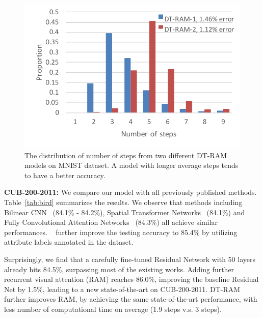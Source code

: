 \documentclass[10pt,twocolumn,letterpaper]{article}
\begin{document}
\setlength{\tabcolsep}{1pt}
\begin{figure}
\begin{center}
    \includegraphics[width=0.95\linewidth]{figs/exp/mnist_distribution.pdf}
\end{center}
\vspace{-10pt}
\caption{The distribution of number of steps from two different DT-RAM models on MNIST dataset. A model with longer average steps tends to have a better accuracy.}
\label{fig:MNIST}
\end{figure}

{\bf CUB-200-2011:} We compare our model with all previously published methods.
Table~\ref{tab:bird} summarizes the results.
We observe that methods including Bilinear CNN~\cite{lin2015bilinear, kong2016low} (84.1\% - 84.2\%), Spatial Transformer Networks~\cite{jaderberg2015spatial} (84.1\%) and Fully Convolutional Attention Networks~\cite{liu2016fine} (84.3\%) all achieve similar performances.
~\cite{liu2016localizing} further improve the testing accuracy to 85.4\% by utilizing attribute labels annotated in the dataset.

Surprisingly, we find that a carefully fine-tuned Residual Network with 50 layers already hits 84.5\%, surpassing most of the existing works.
Adding further recurrent visual attention (RAM) reaches 86.0\%, improving the baseline Residual Net by 1.5\%, leading to a new state-of-the-art on CUB-200-2011.
DT-RAM further improves RAM, by achieving the same state-of-the-art performance, with less number of computational time on average (1.9 steps v.s. 3 steps).
\end{document}
